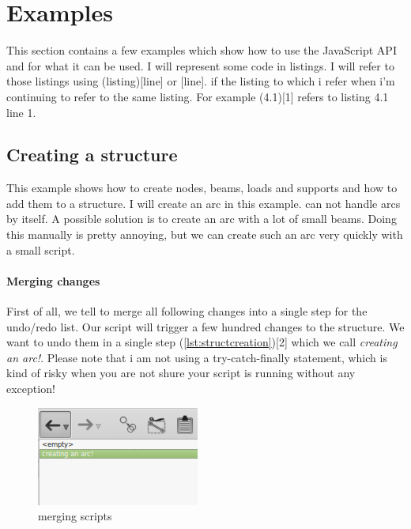 \section{Examples}

This section contains a few examples which show how to use the JavaScript API and for what it can be used. I will represent some code in listings. I will refer to those listings using (listing)[line] or [line]. if the listing to which i refer when i'm continuing to refer to the same listing. For example (4.1)[1] refers to listing 4.1 line 1.

\subsection{Creating a structure}
This example shows how to create nodes, beams, loads and supports and how to add them to a structure. I will create an arc in this example. \Colin can not handle arcs by itself. A possible solution is to create an arc with a lot of small beams. Doing this manually is pretty annoying, but we can create such an arc very quickly with a small script.
\vspace{20}\\
\begin{minipage}[h]{\textwidth-8cm}
\paragraph{Merging changes}
First of all, we tell \Colin to merge all following changes into a single step for the undo/redo list. Our script will trigger a few hundred changes to the structure. We want to undo them in a single step (\ref{lst:structcreation})[2] which we call \textit{creating an arc!}. Please note that i am not using a try-catch-finally statement, which is kind of risky when you are not shure your script is running without any exception!\end{minipage}
\hfill
\begin{minipage}[h]{8cm}
\begin{figure}[H]
\begin{center}
\includegraphics[width=\textwidth-2cm]{../pictures/scriptmerge.png}
\caption{merging scripts}
\label{pic:scriptmerge}
\end{center}
\end{figure}
\end{minipage}
